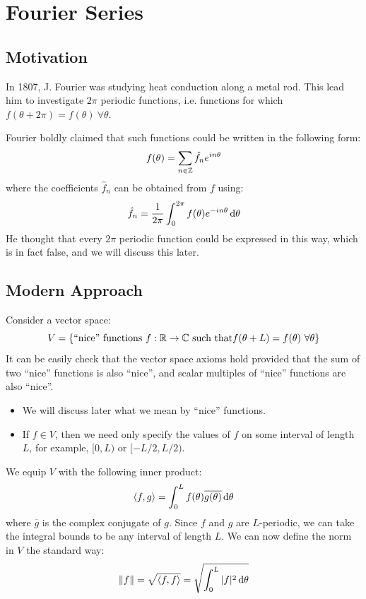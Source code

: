 \documentclass[../main.tex]{subfiles}
\begin{document}
\chapter{Fourier Series} \label{fourierChap}
\section{Motivation}
In 1807, J. Fourier was studying heat conduction along a metal rod.
This lead him to investigate $2\pi$ periodic functions, i.e. functions for which $f(\theta + 2\pi) = f(\theta)\ \forall \theta$.

Fourier boldly claimed that such functions could be written in the following form:
\[
  f(\theta) = \sum_{n \in \mathbb{Z}} \hat{f}_n e^{i n \theta}
\]
where the coefficients $\hat{f}_{n}$ can be obtained from $f$ using:
\[
  \hat{f}_{n} = \frac{1}{2\pi} \int_{0}^{2\pi} f(\theta) e^{-in \theta} \d{\theta}
\]
He thought that every $2\pi$ periodic function could be expressed in this way, which is in fact false, and we will discuss this later.
\section{Modern Approach}
Consider a vector space:
\[
  V = \{\text{``nice'' functions $f: \mathbb{R} \to \mathbb{C}$ such that} f(\theta + L) = f(\theta)\ \forall \theta\}
\]
It can be easily check that the vector space axioms hold provided that the sum of two ``nice'' functions is also ``nice'', and scalar multiples of ``nice'' functions are also ``nice''.
\begin{remark}[Remarks]
  \begin{itemize}
    \item We will discuss later what we mean by ``nice'' functions.
    \item If $f \in V$, then we need only specify the values of $f$ on some interval of length $L$, for example, $[0, L)$ or $[-L/2, L/2)$.
  \end{itemize}
\end{remark}
We equip $V$ with the following inner product:
\begin{equation}
  \langle f, g \rangle = \int_{0}^{L} f(\theta)\overline{g(\theta)} \d{\theta} \label{innerProdFourier}
\end{equation}
where $\overline{g}$ is the complex conjugate of $g$.
Since $f$ and $g$ are $L$-periodic, we can take the integral bounds to be any interval of length $L$.
We can now define the norm in $V$ the standard way:
\begin{equation}
  \norm{f} = \sqrt{\langle f, f \rangle} = \sqrt{\int_{0}^{L} |f|^2 \d{\theta}} \label{fourierNorm}
\end{equation}
\end{document}
